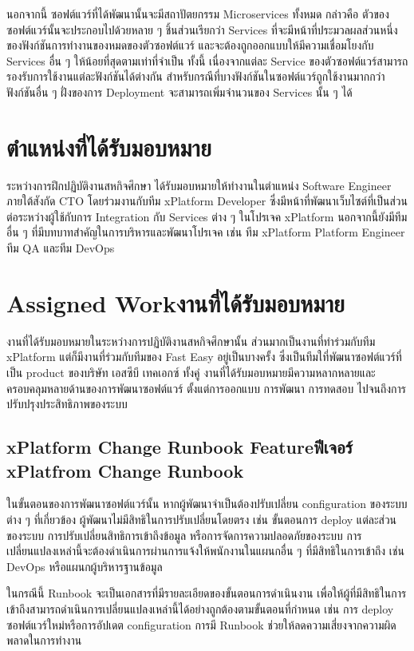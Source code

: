 นอกจากนี้ ซอฟต์แวร์ที่ได้พัฒนานั้นจะมีสถาปัตยกรรม Microservices ทั้งหมด กล่าวคือ ตัวของซอฟต์แวร์นั้นจะประกอบไปด้วยหลาย ๆ ชิ้นส่วนเรียกว่า Services ที่จะมีหน้าที่ประมวลผลส่วนหนึ่งของฟังก์ชันการทำงานของหมดของตัวซอฟต์แวร์ และจะต้องถูกออกแบบให้มีความเชื่อมโยงกับ Services อื่น ๆ ให้น้อยที่สุดตามเท่าที่จำเป็น ทั้งนี้ เนื่องจากแต่ละ Service ของตัวซอฟต์แวร์สามารถรองรับการใช้งานแต่ละฟังก์ชันได้ต่างกัน สำหรับกรณีที่บางฟังก์ชันในซอฟต์แวร์ถูกใช้งานมากกว่าฟังก์ชันอื่น ๆ ฝั่งของการ Deployment จะสามารถเพิ่มจำนวนของ Services นั้น ๆ ได้

\section{ตำแหน่งที่ได้รับมอบหมาย}
ระหว่างการฝึกปฏิบัติงานสหกิจศึกษา ได้รับมอบหมายให้ทำงานในตำแหน่ง Software Engineer ภายใต้สังกัด CTO โดยร่วมงานกับทีม xPlatform Developer ซึ่งมีหน้าที่พัฒนาเว็บไซต์ที่เป็นส่วนต่อระหว่างผู้ใช้กับการ Integration กับ Services ต่าง ๆ ในโปรเจค xPlatform นอกจากนี้ยังมีทีมอื่น ๆ ที่มีบทบาทสำคัญในการบริหารและพัฒนาโปรเจค เช่น ทีม xPlatform Platform Engineer ทีม QA และทีม DevOps


\section{\ifenglish Assigned Work\else งานที่ได้รับมอบหมาย \fi}
งานที่ได้รับมอบหมายในระหว่างการปฏิบัติงานสหกิจศึกษานั้น ส่วนมากเป็นงานที่ทำร่วมกับทีม xPlatform แต่ก็มีงานที่ร่วมกับทีมของ Fast Easy อยู่เป็นบางครั้ง ซึ่งเป็นทีมใที่พัฒนาซอฟต์แวร์ที่เป็น product ของบริษัท เอสซีบี เทคเอกซ์ ทั้งคู่ งานที่ได้รับมอบหมายมีความหลากหลายและครอบคลุมหลายด้านของการพัฒนาซอฟต์แวร์ ตั้งแต่การออกแบบ การพัฒนา การทดสอบ ไปจนถึงการปรับปรุงประสิทธิภาพของระบบ

\subsection{\ifenglish xPlatform Change Runbook​ Feature\else ฟีเจอร์ xPlatfrom Change Runbook\fi}
ในขั้นตอนของการพัฒนาซอฟต์แวร์นั้น หากผู้พัฒนาจำเป็นต้องปรับเปลี่ยน configuration ของระบบต่าง ๆ ที่เกี่ยวข้อง ผู้พัฒนาไม่มีสิทธิในการปรับเปลี่ยนโดยตรง เช่น ขั้นตอนการ deploy แต่ละส่วนของระบบ การปรับเปลี่ยนสิทธิการเข้าถึงข้อมูล หรือการจัดการความปลอดภัยของระบบ การเปลี่ยนแปลงเหล่านี้จะต้องดำเนินการผ่านการแจ้งให้พนักงานในแผนกอื่น ๆ ที่มีสิทธิในการเข้าถึง เช่น DevOps หรือแผนกผู้บริหารฐานข้อมูล

ในกรณีนี้ Runbook จะเป็นเอกสารที่มีรายละเอียดของขั้นตอนการดำเนินงาน เพื่อให้ผู้ที่มีสิทธิในการเข้าถึงสามารถดำเนินการเปลี่ยนแปลงเหล่านี้ได้อย่างถูกต้องตามขั้นตอนที่กำหนด เช่น การ deploy ซอฟต์แวร์ใหม่หรือการอัปเดต configuration การมี Runbook ช่วยให้ลดความเสี่ยงจากความผิดพลาดในการทำงาน

